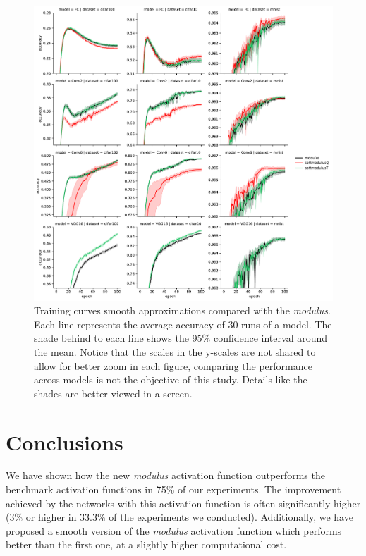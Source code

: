 \begin{figure}[h!]
	\centering
	\includegraphics[width=1.0\linewidth]{modulus/images/training_curves_smooth}
	\caption{Training curves smooth approximations compared with the \textit{modulus}. Each line represents the average accuracy of 30 runs of a model. The shade behind to each line shows the 95\% confidence interval around the mean. Notice that the scales in the y-scales are not shared to allow for better zoom in each figure, comparing the performance across models is not the objective of this study. Details like the shades are better viewed in a screen.}
	\label{fig:training_curves_smooth}
\end{figure}



\section{Conclusions} \label{sec:modulus_conclusions}
We have shown how the new \textit{modulus} activation function outperforms the benchmark activation functions in 75\% of our experiments. The improvement achieved by the networks with this activation function is often significantly higher ($3\%$ or higher in 33.3$\%$ of the experiments we conducted). Additionally, we have proposed a smooth version of the \textit{modulus} activation function which performs better than the first one, at a slightly higher computational cost.

